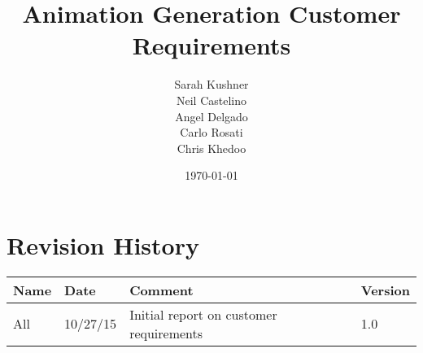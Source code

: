 \documentclass{article}
\begin{document}
\title{Animation Generation Customer Requirements}
\author{Sarah Kushner \\
		Neil Castelino \\
		Angel Delgado \\
		Carlo Rosati \\
		Chris Khedoo}
\date{\today}
\maketitle
\small

\pagebreak
\tableofcontents
\pagebreak
\section{Revision History}
\begin{tabular}{|l|l|l|l|}
\hline
Name	& Date	 		& 	Comment	 								& 	Version	 \\ \hline
All		& 10/27/15		& 	Initial report on customer requirements	&  	1.0 	 \\ \hline
\end{tabular}

\pagebreak





\end{document}
